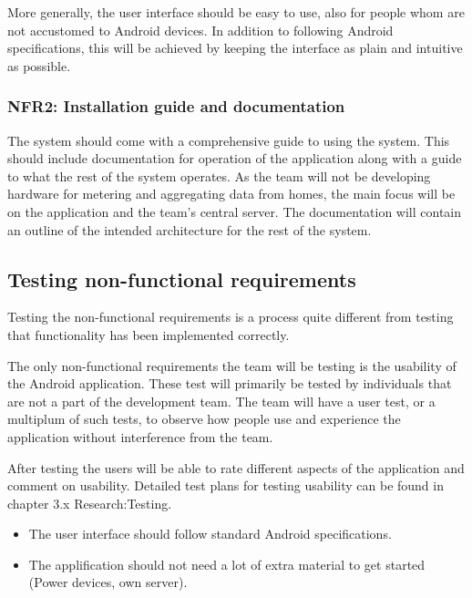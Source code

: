 More generally, the user interface should be easy to use, also for people whom are not accustomed to Android devices. In 
addition to following Android specifications, this will be achieved by keeping the interface as plain and intuitive as possible.

\subsubsection{NFR2: Installation guide and documentation}
The system should come with a comprehensive guide to using the system. This should include documentation for operation of the
application along with a guide to what the rest of the system operates. As the team will not be developing hardware for metering and 
aggregating data from homes, the main focus will be on the application and the team's central server. The documentation will contain an outline 
of the intended architecture for the rest of the system.

\subsection{Testing non-functional requirements}
Testing the non-functional requirements is a process quite different from testing that functionality has been implemented correctly.

The only non-functional requirements the team will be testing is the usability of the Android application. These test will primarily be 
tested by individuals that are not a part of the development team. The team will have a user test, or a multiplum of such tests, to observe how people use and experience the application without interference from the team. 

After testing the users will be able to rate different aspects of the application and comment on usability. Detailed 
test plans for testing usability can be found in chapter 3.x Research:Testing.

\begin{itemize}
\item The user interface should follow standard Android specifications. 
\item The applification should not need a lot of extra material to get started (Power devices, own server).
\end{itemize}


